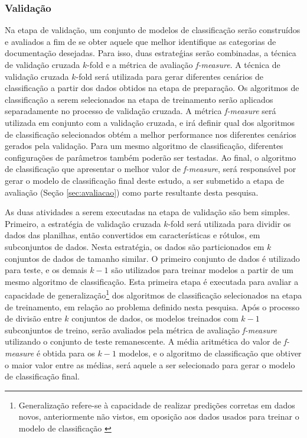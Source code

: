 \subsubsection{Validação}
\label{sec:validacao}
Na etapa de validação, um conjunto de modelos de classificação serão construídos e avaliados a fim de se obter aquele que melhor identifique as categorias de documentação desejadas. Para isso, duas estrateǵias serão combinadas, a técnica de validação cruzada $k$-fold e a métrica de avaliação \textit{f-measure}. A técnica de validação cruzada $k$-fold será utilizada para gerar diferentes cenários de classificação a partir dos dados obtidos na etapa de preparação. Os algoritmos de classificação a serem selecionados na etapa de treinamento serão aplicados separadamente no processo de validação cruzada. A métrica \textit{f-measure} será utilizada em conjunto com a validação cruzada, e irá definir qual dos algoritmos de classificação selecionados obtém a melhor performance nos diferentes cenários gerados pela validação. Para um mesmo algoritmo de classificação, diferentes configurações de parâmetros também poderão ser testadas. Ao final, o algoritmo de classificação que apresentar o melhor valor de \textit{f-measure}, será responsável por gerar o modelo de classificação final deste estudo, a ser submetido a etapa de avaliação (Seção \ref{sec:avaliacao}) como parte resultante desta pesquisa.   

As duas atividades a serem executadas na etapa de validação são bem simples.  Primeiro, a estratégia de validação cruzada $k$-fold será utilizada para dividir os dados das planilhas, então convertidos em características e rótulos, em subconjuntos de dados. Nesta estratégia, os dados são particionados em $k$ conjuntos de dados de tamanho similar. O primeiro conjunto de dados é utilizado para teste, e os demais $k - 1$ são utilizados para treinar modelos a partir de um mesmo algoritmo de classificação. Esta primeira etapa é executada para avaliar a capacidade de generalização\footnote{Generalização refere-se à capacidade de realizar predições corretas em dados novos, anteriormente não vistos, em oposição aos dados usados para treinar o modelo de classificação \citep{google2019generalization}} dos algoritmos de classificação selecionados na etapa de treinamento, em relação ao problema definido nesta pesquisa. Após o processo de divisão entre $k$ conjuntos de dados, os modelos treinados com $k-1$ subconjuntos de treino, serão avaliados pela métrica de avaliação \textit{f-measure} utilizando o conjunto de teste remanescente. A média aritmética do valor de \textit{f-measure} é obtida para os $k - 1$ modelos, e o algoritmo de classificação que obtiver o maior valor entre as médias, será aquele a ser selecionado para gerar o modelo de classificação final.



